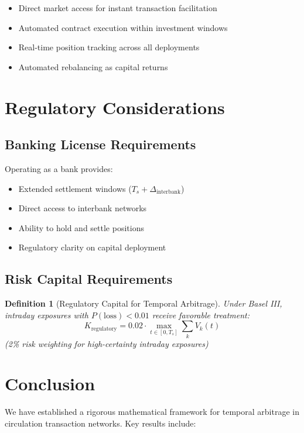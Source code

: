 \documentclass[12pt]{article}
\newtheorem{definition}[theorem]{Definition}
\begin{document}
\begin{itemize}
    \item Direct market access for instant transaction facilitation
    \item Automated contract execution within investment windows
    \item Real-time position tracking across all deployments
    \item Automated rebalancing as capital returns
\end{itemize}

\section{Regulatory Considerations}

\subsection{Banking License Requirements}

Operating as a bank provides:
\begin{itemize}
    \item Extended settlement windows ($T_s + \Delta_{\text{interbank}}$)
    \item Direct access to interbank networks
    \item Ability to hold and settle positions
    \item Regulatory clarity on capital deployment
\end{itemize}

\subsection{Risk Capital Requirements}

\begin{definition}[Regulatory Capital for Temporal Arbitrage]
Under Basel III, intraday exposures with $P(\text{loss}) < 0.01$ receive favorable treatment:
$$
K_{\text{regulatory}} = 0.02 \cdot \max_{t \in [0,T_s]} \sum_k V_k(t)
$$
(2\% risk weighting for high-certainty intraday exposures)
\end{definition}

\section{Conclusion}

We have established a rigorous mathematical framework for temporal arbitrage in circulation transaction networks. Key results include:
\end{document}
